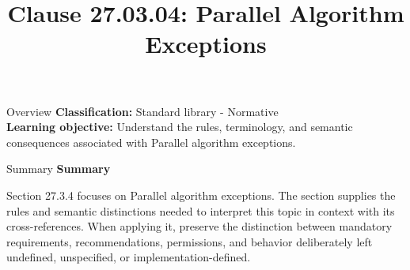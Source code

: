 \documentclass[10pt,letterpaper]{article}
\title{Clause 27.03.04: Parallel Algorithm Exceptions}
\author{}
\date{}
\begin{document}
\maketitle
\begin{CornellOverviewBox}{Overview}
\textbf{Classification:} Standard library - Normative\\[2pt]
\textbf{Learning objective:} Understand the rules, terminology, and semantic consequences associated with Parallel algorithm exceptions.
\end{CornellOverviewBox}\begin{CornellSummaryBox}{Summary}
{\sffamily\bfseries\color{Accent} Summary}\par\vspace{3pt}Section 27.3.4 focuses on Parallel algorithm exceptions. The section supplies the rules and semantic distinctions needed to interpret this topic in context with its cross-references. When applying it, preserve the distinction between mandatory requirements, recommendations, permissions, and behavior deliberately left undefined, unspecified, or implementation-defined.
\end{CornellSummaryBox}
\end{document}
